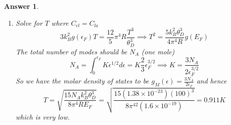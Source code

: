 \documentclass[a4paper]{article}
\newtheorem{ans}{Answer}[subsection]
\theoremstyle{new}
\begin{document}
\begin{ans}
\begin{enumerate}[label=(\roman*)]
\begin{enumerate}[label=(\alph*)]
$$U_{\text{la}}\sim\int_0^\infty\epsilon e^{-\epsilon/k_BT}3\frac{4\pi\epsilon^2}{v_s^3}d\epsilon$$
The evaluated integral has a $T^4$ behaviour and thus the lattice contribution to the heat capacity is $C_{\text{la}}\sim T^3$. This approximation is valid at $T<<\theta_D$ for some characteristic temperature $\theta_D$. But if $T>>\theta_D$, all $3N$ modes have been excited since by equipartition theorem, each of the 6 degrees of freedom has $\frac{1}{2}k_BT$, so $C_{\text{la}}\sim 3k_BT$. In reality, finding $\theta_D$ requires knowledge of the form of $\omega(\mathbf{q})$ but with a quick estimation, it yields $\theta_D\propto n^{1/2}v_s$ where $n=N/V$.
\end{enumerate}
\item Solve for $T$ where $C_{el}=C_{la}$
$$3k_B^2g(\epsilon_F)T=\frac{12}{5}\pi^4R\frac{T^3}{\theta_D^3}\implies T^2=\frac{5k_B^2\theta_D^3}{4\pi^4R}g(E_F)$$
The total number of modes should be $N_A$ (one mole) 
$$N_A=\int_0^{\epsilon_F}K\epsilon^{1/2}d\epsilon=K\frac{2}{3}\epsilon_F^{3/2}\implies K=\frac{3N_A}{2\epsilon_F^{3/2}}$$
So we have the molar density of states to be $g_M(\epsilon)=\frac{3N_A}{2\epsilon_F}$ and hence
$$T=\sqrt{\frac{15N_Ak_B^2\theta_D^3}{8\pi^4RE_F}}=\sqrt{\frac{15(1.38\times10^{-23})(100)^3}{8\pi^42(1.6\times10^{-19})}}=0.911K$$
which is very low.
\end{enumerate}
\end{ans}
\newpage
\end{document}
